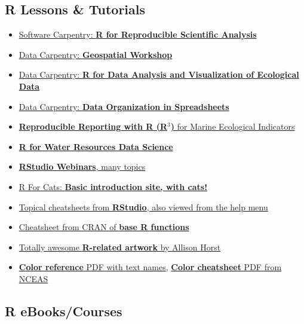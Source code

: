 \documentclass[
]{book}
\providecommand{\tightlist}{%
  \setlength{\itemsep}{0pt}\setlength{\parskip}{0pt}}
\begin{document}
\hypertarget{r-lessons-tutorials}{%
\subsection{R Lessons \& Tutorials}\label{r-lessons-tutorials}}

\begin{itemize}
\tightlist
\item
  \href{http://data-lessons.github.io/gapminder-R/}{Software Carpentry: \textbf{R for Reproducible Scientific Analysis}}
\item
  \href{https://datacarpentry.org/geospatial-workshop/}{Data Carpentry: \textbf{Geospatial Workshop}}
\item
  \href{http://www.datacarpentry.org/R-ecology-lesson/}{Data Carpentry: \textbf{R for Data Analysis and Visualization of Ecological Data}}
\item
  \href{http://www.datacarpentry.org/spreadsheet-ecology-lesson/}{Data Carpentry: \textbf{Data Organization in Spreadsheets}}
\item
  \href{https://noaa-iea.github.io/r3-train/}{\textbf{Reproducible Reporting with R (R\(^3\))} for Marine Ecological Indicators}
\item
  \href{https://www.r4wrds.com/}{\textbf{R for Water Resources Data Science}}
\item
  \href{https://www.rstudio.com/resources/webinars/}{\textbf{RStudio Webinars}, many topics}
\item
  \href{http://rforcats.net/}{R For Cats: \textbf{Basic introduction site, with cats!}}
\item
  \href{http://www.rstudio.com/resources/cheatsheets/}{Topical cheatsheets from \textbf{RStudio}, also viewed from the help menu}
\item
  \href{http://cran.r-project.org/doc/contrib/Short-refcard.pdf}{Cheatsheet from CRAN of \textbf{base R functions}}
\item
  \href{https://github.com/allisonhorst/stats-illustrations}{Totally awesome \textbf{R-related artwork} by Allison Horst}
\item
  \href{http://www.stat.columbia.edu/~tzheng/files/Rcolor.pdf}{\textbf{Color reference} PDF with text names}, \href{https://www.nceas.ucsb.edu/sites/default/files/2020-04/colorPaletteCheatsheet.pdf}{\textbf{Color cheatsheet} PDF from NCEAS}
\end{itemize}

\hypertarget{r-ebookscourses}{%
\subsection{R eBooks/Courses}\label{r-ebookscourses}}
\end{document}
